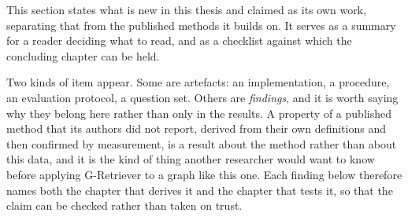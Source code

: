 This section states what is new in this thesis and claimed as its own work,
separating that from the published methods it builds on. It serves as a summary
for a reader deciding what to read, and as a checklist against which the
concluding chapter can be held.

Two kinds of item appear. Some are artefacts: an implementation, a procedure, an
evaluation protocol, a question set. Others are \emph{findings}, and it is worth
saying why they belong here rather than only in the results. A property of a
published method that its authors did not report, derived from their own
definitions and then confirmed by measurement, is a result about the method
rather than about this data, and it is the kind of thing another researcher would
want to know before applying G-Retriever to a graph like this one. Each finding
below therefore names both the chapter that derives it and the chapter that tests
it, so that the claim can be checked rather than taken on trust.

